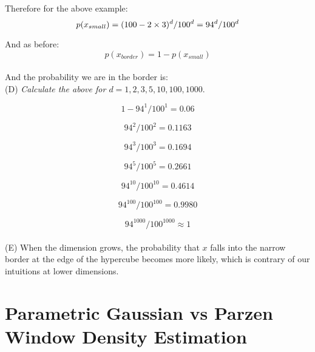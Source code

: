\documentclass{amsart}
\theoremstyle{definition}
\theoremstyle{remark}
\numberwithin{equation}{section}
\begin{document}
Therefore for the above example: \\

\begin{equation}
    p(x_{small}) = (100 - 2 \times 3)^d / 100^d = 94^d / 100^d \\
\end{equation}

And as before: \\

\begin{equation}
    p(x_{border}) = 1 - p(x_{small})
\end{equation} \\

And the probability we are in the border is: \\

(D) \textit{Calculate the above for $d = {1, 2, 3, 5, 10, 100, 1000}$}.

\begin{equation}
    1- 94^1 / 100^1 = 0.06
\end{equation}

\begin{equation}
    94^2 / 100^2 = 0.1163
\end{equation}

\begin{equation}
    94^3 / 100^3 = 0.1694
\end{equation}

\begin{equation}
    94^5 / 100^5 = 0.2661
\end{equation}

\begin{equation}
    94^{10} / 100^{10} = 0.4614
\end{equation}

\begin{equation}
    94^{100} / 100^{100} = 0.9980
\end{equation}

\begin{equation}
    94^{1000} / 100^{1000} \approx 1
\end{equation} \\

(E) When the dimension grows, the probability that $x$ falls into the narrow 
border at the edge of the hypercube becomes more likely, which is contrary of 
our intuitions at lower dimensions. 

\section{Parametric Gaussian vs Parzen Window Density Estimation}
\end{document}
